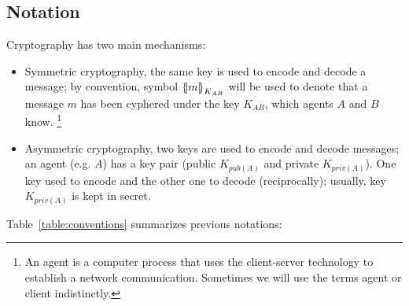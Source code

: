 \subsection{Notation}

Cryptography has two main mechanisms:
\begin{itemize}
  \item Symmetric cryptography, the same key is used to encode and
    decode a message; by convention, symbol $\fat{m}_{K_{AB}}$ will be
    used to denote that a message $m$ has been cyphered under the key
    $K_{AB}$, which agents $A$ and $B$ know. \footnote{An agent is a 
        computer process that uses the client-server technology to 
        establish a network communication. Sometimes we will use the 
        terms agent or client indistinctly.} 
  \item Asymmetric cryptography, two keys are used to encode and
    decode messages; an agent (e.g. $A$) has a key pair
    (public $K_{pub(A)}$ and private $K_{priv(A)}$). One key used to
    encode and the other one to decode (reciprocally); usually, key
    $K_{priv(A)}$ is kept in secret. 
\end{itemize}
Table~\ref{table:conventions} summarizes previous notations:
